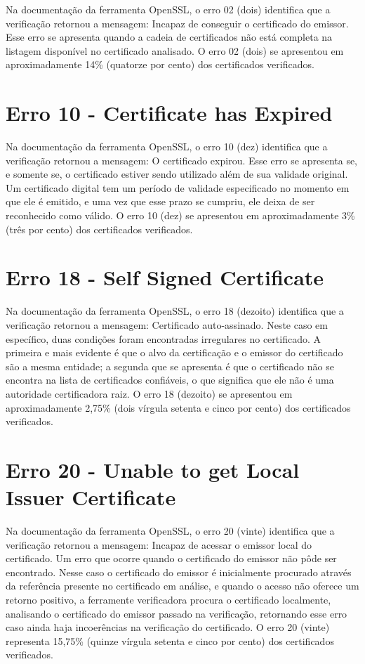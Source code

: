 	Na documentação da ferramenta OpenSSL, o erro 02 (dois) identifica que a verificação retornou a mensagem: Incapaz de conseguir o certificado do emissor.
	Esse erro se apresenta quando a cadeia de certificados não está completa na listagem disponível no certificado analisado. O erro 02 (dois) se apresentou em aproximadamente 14\% (quatorze por cento) dos certificados verificados.

\section[Erro 10 - Certificate has Expired]{Erro 10 - Certificate has Expired}

	Na documentação da ferramenta OpenSSL, o erro 10 (dez) identifica que a verificação retornou a mensagem: O certificado expirou.
	Esse erro se apresenta se, e somente se, o certificado estiver sendo utilizado além de sua validade original. Um certificado digital tem um período de validade especificado no momento em que ele é emitido, e uma vez que esse prazo se cumpriu, ele deixa de ser reconhecido como válido. O erro 10 (dez) se apresentou em aproximadamente 3\% (três por cento) dos certificados verificados.

\section[Erro 18 - Self Signed Certificate]{Erro 18 - Self Signed Certificate}

	Na documentação da ferramenta OpenSSL, o erro 18 (dezoito) identifica que a verificação retornou a mensagem: Certificado auto-assinado.
	Neste caso em específico, duas condições foram encontradas irregulares no certificado. A primeira e mais evidente é que o alvo da certificação e o emissor do certificado são a mesma entidade; a segunda que se apresenta é que o certificado não se encontra na lista de certificados confiáveis, o que significa que ele não é uma autoridade certificadora raiz.
	O erro 18 (dezoito) se apresentou em aproximadamente 2,75\% (dois vírgula setenta e cinco por cento) dos certificados verificados.
	
\section[Erro 20 - Unable to get Local Issuer Certificate]{Erro 20 - Unable to get Local Issuer Certificate}

	Na documentação da ferramenta OpenSSL, o erro 20 (vinte) identifica que a verificação retornou a mensagem: Incapaz de acessar o emissor local do certificado.
	Um erro que ocorre quando o certificado do emissor não pôde ser encontrado. Nesse caso o certificado do emissor é inicialmente procurado através da referência presente no certificado em análise, e quando o acesso não oferece um retorno positivo, a ferramente verificadora procura o certificado localmente, analisando o certificado do emissor passado na verificação, retornando esse erro caso ainda haja incoerências na verificação do certificado.
	O erro 20 (vinte) representa 15,75\% (quinze vírgula setenta e cinco por cento) dos certificados verificados.
